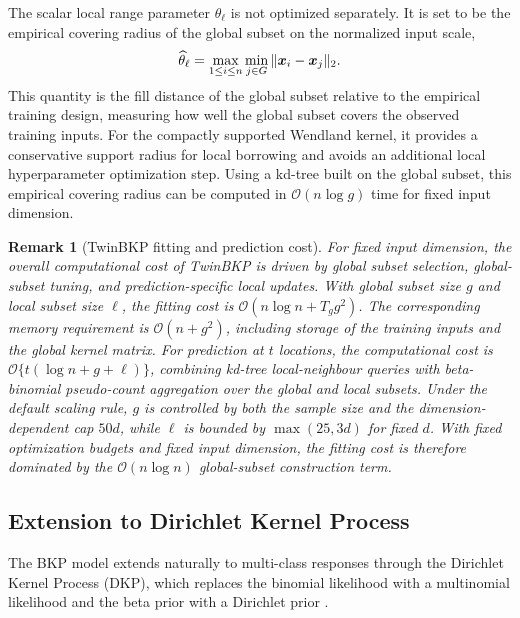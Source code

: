 \documentclass[article, shortnames]{jss}
\newtheorem{remark}{Remark}
\renewcommand{\vec}[1]{\mbox{\boldmath ${#1}$}}
\begin{document}
The scalar local range parameter $\theta_\ell$ is not optimized separately. 
It is set to be the empirical covering radius \citep{Vakayil2024TwinGP} of the global subset on the normalized input scale,
\[
\widehat{\theta}_\ell 
= \max_{1\le i\le n} \min_{j\in G} \|\vec{x}_i-\vec{x}_j\|_2 .
\]
This quantity is the fill distance \citep{Fasshauer2007Meshfree} of the global subset relative to the empirical training design, measuring how well the global subset covers the observed training inputs.
For the compactly supported Wendland kernel, it provides a conservative support radius for local borrowing and avoids an additional local hyperparameter optimization step.
Using a kd-tree built on the global subset, this empirical covering radius can be computed in $\mathcal{O}(n\log g)$ time for fixed input dimension.

\begin{remark}[TwinBKP fitting and prediction cost]
	For fixed input dimension, the overall computational cost of TwinBKP is driven by global subset selection, global-subset tuning, and prediction-specific local updates. 
	With global subset size $g$ and local subset size $\ell$, the fitting cost is 
	$\mathcal{O}(n\log n + T_g g^2)$. %
	The corresponding memory requirement is $\mathcal{O}(n+g^2)$, including storage of the training inputs and the global kernel matrix. 
	For prediction at $t$ locations, the computational cost is $\mathcal{O}\{t(\log n+g+\ell)\}$, combining kd-tree local-neighbour queries with beta-binomial pseudo-count aggregation over the global and local subsets.	
	Under the default scaling rule, $g$ is controlled by both the sample size and the dimension-dependent cap $50d$, while $\ell$ is bounded by $\max(25,3d)$ for fixed $d$. 
	With fixed optimization budgets and fixed input dimension, the fitting cost is therefore dominated by the $\mathcal{O}(n\log n)$ global-subset construction term. 
\end{remark}

\subsection{Extension to Dirichlet Kernel Process}\label{sec:dkp}

The BKP model extends naturally to multi-class responses through the Dirichlet Kernel Process (DKP), which replaces the binomial likelihood with a multinomial likelihood and the beta prior with a Dirichlet prior \citep{MacKenzie2014}. 
\end{document}
